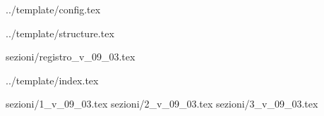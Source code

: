  {../template/config.tex}


\def\DOCUMENTO{Verbale esterno 09/03/2016}
\def\VERSIONE{1.0.0}

\def\DESCRIZIONE{<Info documento>}

\def\REDATTORE {Francesco Bizzaro}
\def\VERIFICATORE {Alberto Andriolo\\ & Riccardo Rizzo}
\def\RESPONSABILE {Enrico Chiara}

\def\USO {Esterno}

\def\DISTRIBUZIONE {\GRUPPO{}\\ & \COMMITTENTE{}\\ & \PROPONENTE{}\\}

\def\DESCRIZIONE {Verbale di incontro per il progetto \PROGETTO\ tra il gruppo \GRUPPO\ e il Proponente \PROPONENTE}


\def\INDICE	{true}
\def\TABELLE {false}
\def\FIGURE {false}


 {../template/structure.tex}

 {sezioni/registro_v_09_03.tex}

 {../template/index.tex}

 {sezioni/1_v_09_03.tex}
 {sezioni/2_v_09_03.tex}
 {sezioni/3_v_09_03.tex}





